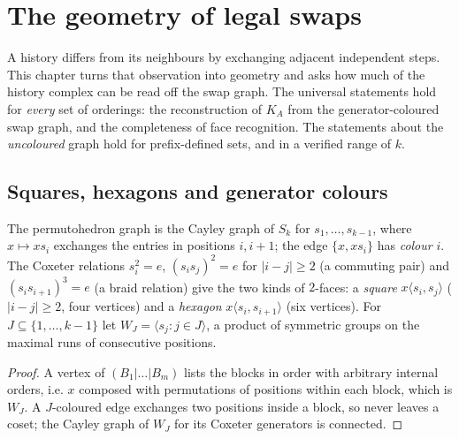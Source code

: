 \chapter{The geometry of legal swaps}\label{ch:swaps}

A history differs from its neighbours by exchanging adjacent independent steps. This chapter turns that observation into geometry and asks how much of the history complex can be read off the swap graph. The universal statements hold for \emph{every} set of orderings: the reconstruction of $K_A$ from the generator-coloured swap graph, and the completeness of face recognition. The statements about the \emph{uncoloured} graph hold for prefix-defined sets, and in a verified range of $k$.

\section{Squares, hexagons and generator colours}
The permutohedron graph is the Cayley graph of $S_k$ for $s_1,\dots,s_{k-1}$, where $x\mapsto xs_i$ exchanges the entries in positions $i,i{+}1$; the edge $\{x,xs_i\}$ has \emph{colour} $i$. The Coxeter relations $s_i^2=e$, $(s_is_j)^2=e$ for $|i-j|\ge2$ (a commuting pair) and $(s_is_{i+1})^3=e$ (a braid relation) give the two kinds of $2$-faces: a \emph{square} $x\langle s_i,s_j\rangle$ ($|i-j|\ge2$, four vertices) and a \emph{hexagon} $x\langle s_i,s_{i+1}\rangle$ (six vertices). For $J\subseteq\{1,\dots,k-1\}$ let $W_J=\langle s_j:j\in J\rangle$, a product of symmetric groups on the maximal runs of consecutive positions.

\begin{proof}
A vertex of $(B_1|\dots|B_m)$ lists the blocks in order with arbitrary internal orders, i.e. $x$ composed with permutations of positions within each block, which is $W_J$. A $J$-coloured edge exchanges two positions inside a block, so never leaves a coset; the Cayley graph of $W_J$ for its Coxeter generators is connected.
\end{proof}

